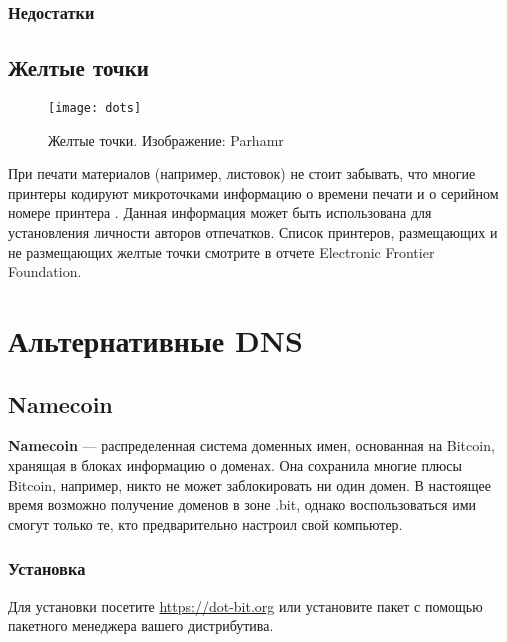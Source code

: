 \subsubsection{Недостатки}
\subsection{Желтые точки}
\begin{wrapfigure}[9]{r}{0.25\linewidth}
\texttt{[image: dots]}
\caption{Желтые точки. Изображение: Parhamr}
\end{wrapfigure}
При печати материалов (например, листовок) не стоит забывать, что многие принтеры кодируют микроточками информацию о времени печати и о серийном номере принтера \cite{eff_dots}. Данная информация может быть использована для установления личности авторов отпечатков. Список принтеров, размещающих и не размещающих желтые точки смотрите в отчете Electronic Frontier Foundation\cite{eff_list}.

\section{Альтернативные DNS}
\subsection{Namecoin}
\textbf{Namecoin} --- распределенная система доменных имен, основанная на Bitcoin, хранящая в блоках информацию о доменах. Она сохранила многие плюсы Bitcoin, например, никто не может заблокировать ни один домен. В настоящее время возможно получение доменов в зоне .bit, однако воспользоваться ими смогут только те, кто предварительно настроил свой компьютер.
\subsubsection{Установка}
Для установки посетите \url{https://dot-bit.org} или установите пакет с помощью пакетного менеджера вашего дистрибутива.
